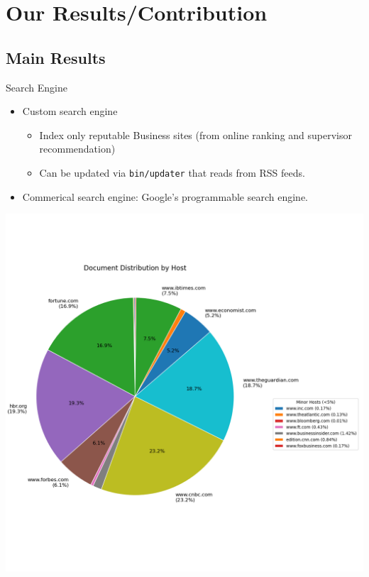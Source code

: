 \documentclass{beamer}
\begin{document}
\section{Our Results/Contribution}
\subsection{Main Results}

\begin{frame}{Search Engine}
\begin{itemize}
	\item Custom search engine
	\begin{itemize}
	\item Index only reputable Business sites (from online ranking and
		supervisor recommendation)
	\item Can be updated via \texttt{bin/updater} that reads from RSS feeds.
	\end{itemize}
	\item Commerical search engine: Google's programmable search engine.
\end{itemize}
	\vspace{-.6cm}
	\begin{center}
	\includegraphics[width=.5\textwidth]{../../deliverables/thesis/res/doc_host_dist.png}
	\end{center}
\end{frame}
\end{document}
